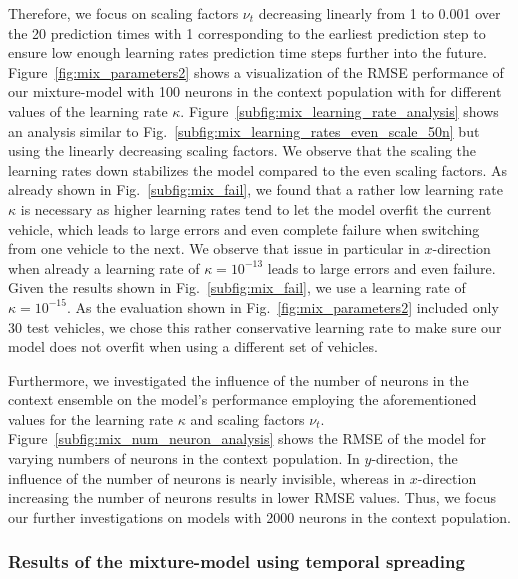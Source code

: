 Therefore, we focus on scaling factors $\nu_t$ decreasing linearly from \num{1} to \num{0.001} over the \num{20} prediction times with \num{1} corresponding to the earliest prediction step to ensure low enough learning rates prediction time steps further into the future.
Figure~\ref{fig:mix_parameters2} shows a visualization of the \ac{RMSE} performance of our mixture-model with \num{100} neurons in the context population with for different values of the learning rate $\kappa$.
Figure~\ref{subfig:mix_learning_rate_analysis} shows an analysis similar to Fig.~\ref{subfig:mix_learning_rates_even_scale_50n} but using the linearly decreasing scaling factors.
We observe that the scaling the learning rates down stabilizes the model compared to the even scaling factors.
As already shown in Fig.~\ref{subfig:mix_fail}, we found that a rather low learning rate $\kappa$ is necessary as higher learning rates tend to let the model overfit the current vehicle, which leads to large errors and even complete failure when switching from one vehicle to the next.
We observe that issue in particular in $x$-direction when already a learning rate of $\kappa = 10^{-13}$ leads to large errors and even failure.
Given the results shown in Fig.~\ref{subfig:mix_fail}, we use a learning rate of $\kappa=10^{-15}$.
As the evaluation shown in Fig.~\ref{fig:mix_parameters2} included only \num{30} test vehicles, we chose this rather conservative learning rate to make sure our model does not overfit when using a different set of vehicles.

Furthermore, we investigated the influence of the number of neurons in the context ensemble on the model's performance employing the aforementioned values for the learning rate $\kappa$ and scaling factors $\nu_{t}$.
Figure~\ref{subfig:mix_num_neuron_analysis} shows the \ac{RMSE} of the model for varying numbers of neurons in the context population. 
In $y$-direction, the influence of the number of neurons is nearly invisible, whereas in $x$-direction increasing the number of neurons results in lower \ac{RMSE} values.
Thus, we focus our further investigations on models with \num{2000} neurons in the context population.

\subsubsection{Results of the mixture-model using temporal spreading}%
\label{ssubsec:results_of_the_mixture_model_using_temporal_spreading}


